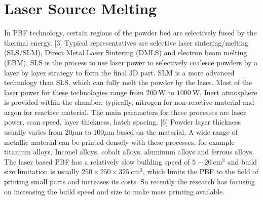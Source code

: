 \documentclass[10pt]{article}
\begin{document}
\section*{Laser Source Melting}
In PBF technology, certain regions of the powder bed are selectively fused by the thermal energy. [3] Typical representatives are selective laser sintering/melting (SLS/SLM), Direct Metal Laser Sintering (DMLS) and electron beam melting (EBM). SLS is the process to use laser power to selectively coalesce powders by a layer by layer strategy to form the final 3D part. SLM is a more advanced technology than SLS, which can fully melt the powder by the laser. Most of the laser power for these technologies range from $200 \mathrm{~W}$ to $1000 \mathrm{~W}$. Inert atmosphere is provided within the chamber: typically, nitrogen for non-reactive material and argon for reactive material. The main parameters for these processes are laser power, scan speed, layer thickness, hatch spacing. [6] Powder layer thickness usually varies from $20 \mu \mathrm{m}$ to $100 \mu \mathrm{m}$ based on the material. A wide range of metallic material can be printed densely with these processes, for example titanium alloys, Inconel alloys, cobalt alloys, aluminum alloys and ferrous alloys. The laser based PBF has a relatively slow building speed of $5-20 \mathrm{~cm}^{3}$ and build size limitation is usually $250 \times 250 \times 325 \mathrm{~cm}^{3}$, which limits the PBF to the field of printing small parts and increases its costs. So recently the research has focusing on increasing the build speed and size to make mass printing available.
\end{document}
